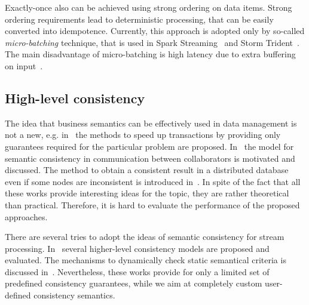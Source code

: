 Exactly-once also can be achieved using strong ordering on data items. Strong ordering requirements lead to deterministic processing, that can be easily converted into idempotence. Currently, this approach is adopted only by so-called {\em micro-batching} technique, that is used in Spark Streaming~\cite{Zaharia:2012:DSE:2342763.2342773} and Storm Trident~\cite{apache:storm:trident}. The main disadvantage of micro-batching is high latency due to extra buffering on input~\cite{S7530084}.

\subsection{High-level consistency}

The idea that business semantics can be effectively used in data management is not a new, e.g. in~\cite{Garcia-Molina:1983:USK:319983.319985} the methods to speed up transactions by providing only guarantees required for the particular problem are proposed. In~\cite{Guo:2010:CMS:1822018.1822052} the model for semantic consistency in communication between collaborators is motivated and discussed. The method to obtain a consistent result in a distributed database even if some nodes are inconsistent is introduced in~\cite{Rodriguez:2008:ITA:1463434.1463480}. In spite of the fact that all these works provide interesting ideas for the topic, they are rather theoretical than practical. Therefore, it is hard to evaluate the performance of the proposed approaches.

There are several tries to adopt the ideas of semantic consistency for stream processing. In~\cite{Mihaila:2008:AIO:1458082.1458132} several higher-level consistency models are proposed and evaluated. The mechanisms to dynamically check static semantical criteria is discussed in~\cite{Fischer:2010:SSP:1739041.1739068}. Nevertheless, these works provide for only a limited set of predefined consistency guarantees, while we aim at completely custom user-defined consistency semantics.  